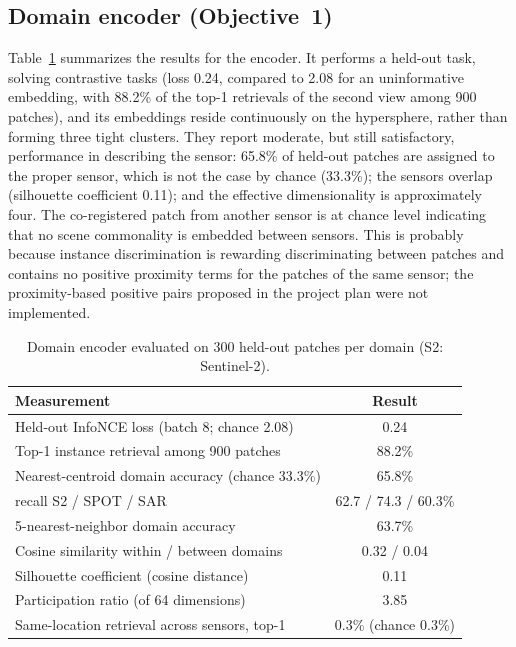 \documentclass[runningheads]{llncs}
\begin{document}
\subsection{Domain encoder (Objective~1)}
Table~\ref{tab:enc} summarizes the results for the encoder. It performs a held-out task, solving contrastive tasks (loss 0.24, compared to 2.08 for an uninformative embedding, with 88.2\% of the top-1 retrievals of the second view among 900 patches), and its embeddings reside continuously on the hypersphere, rather than forming three tight clusters. They report moderate, but still satisfactory, performance in describing the sensor: 65.8\% of held-out patches are assigned to the proper sensor, which is not the case by chance (33.3\%); the sensors overlap (silhouette coefficient 0.11); and the effective dimensionality is approximately four. The co-registered patch from another sensor is at chance level indicating that no scene commonality is embedded between sensors. This is probably because instance discrimination is rewarding discriminating between patches and contains no positive proximity terms for the patches of the same sensor; the proximity-based positive pairs proposed in the project plan were not implemented.


\begin{table}[t]
\centering
\caption{Domain encoder evaluated on 300 held-out patches per domain (S2: Sentinel-2).}
\label{tab:enc}
\begin{tabular}{@{}lc@{}}
\toprule
\textbf{Measurement} & \textbf{Result} \\
\midrule
Held-out InfoNCE loss (batch 8; chance 2.08)        & 0.24 \\
Top-1 instance retrieval among 900 patches          & 88.2\% \\
Nearest-centroid domain accuracy (chance 33.3\%)    & 65.8\% \\
\quad recall S2 / SPOT / SAR                        & 62.7 / 74.3 / 60.3\% \\
5-nearest-neighbor domain accuracy                  & 63.7\% \\
Cosine similarity within / between domains          & 0.32 / 0.04 \\
Silhouette coefficient (cosine distance)            & 0.11 \\
Participation ratio (of 64 dimensions)              & 3.85 \\
Same-location retrieval across sensors, top-1       & 0.3\% (chance 0.3\%) \\
\bottomrule
\end{tabular}
\end{table}
\end{document}
